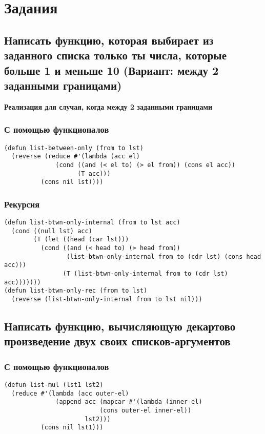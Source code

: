 \chapter{Задания}

\section{Написать функцию, которая выбирает из заданного списка только ты числа, которые больше 1 и меньше 10 (Вариант: между 2 заданными границами)}

\textbf{Реализация для случая, когда между 2 заданными границами}

\subsection{С помощью функционалов}

\begin{lstlisting}
(defun list-between-only (from to lst) 
  (reverse (reduce #'(lambda (acc el) 
              (cond ((and (< el to) (> el from)) (cons el acc))
                    (T acc)))
          (cons nil lst))))
\end{lstlisting}

\subsection{Рекурсия}

\begin{lstlisting}
(defun list-btwn-only-internal (from to lst acc)
  (cond ((null lst) acc)
        (T (let ((head (car lst)))
          (cond ((and (< head to) (> head from)) 
                 (list-btwn-only-internal from to (cdr lst) (cons head acc)))
                (T (list-btwn-only-internal from to (cdr lst) acc)))))))
(defun list-btwn-only-rec (from to lst)
  (reverse (list-btwn-only-internal from to lst nil)))
\end{lstlisting}

\section{Написать функцию, вычисляющую декартово произведение двух своих списков-аргументов}

\subsection{С помощью функционалов}

\begin{lstlisting}
(defun list-mul (lst1 lst2)
  (reduce #'(lambda (acc outer-el)
              (append acc (mapcar #'(lambda (inner-el)
                          (cons outer-el inner-el))
                      lst2)))
          (cons nil lst1)))
\end{lstlisting}

